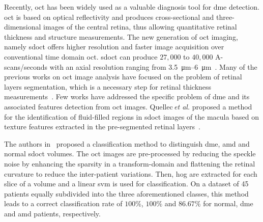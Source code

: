 Recently, \ac{oct} has been widely used as a valuable diagnosis tool for \ac{dme} detection.
\ac{oct} is based on optical reflectivity and produces cross-sectional and three-dimensional images of the central retina, thus allowing quantitative retinal thickness and structure measurements.
The new generation of \ac{oct} imaging, namely \ac{sdoct} offers higher resolution and faster image acquisition over conventional time domain \ac{oct}. \Ac{sdoct} can produce $27,000$ to $40,000$ A-scans/seconds with an axial resolution ranging from \SIrange{3.5}{6}{\micro \metre}~\cite{Chen2005}. 
Many of the previous works on \ac{oct} image analysis have focused on the problem of retinal layers segmentation, which is a necessary step for retinal thickness measurements~\cite{Chiu2010,Kafieh2013}.
Few works have addressed the specific problem of \ac{dme} and its associated features detection from \ac{oct} images. 
Quellec\,\textit{et al.} proposed a method for the identification of fluid-filled regions in \ac{sdoct} images of the macula based on texture features extracted in the pre-segmented retinal layers~\cite{Quellec2010}.

The authors in~\cite{Srinivasan2014} proposed a classification method to distinguish \ac{dme}, \ac{amd} and normal \ac{sdoct} volumes.
The \ac{oct} images are pre-processed by reducing the speckle noise by enhancing the sparsity in a transform-domain and flattening the retinal curvature to reduce the inter-patient variations.
Then, \ac{hog} are extracted for each slice of a volume and a linear \ac{svm} is used for classification. 
On a dataset of 45 patients equally subdivided into the three aforementioned classes, this method leads to a correct classification rate of $100 \%$, $100 \%$ and $86.67 \%$ for normal, \ac{dme} and \ac{amd} patients, respectively.

